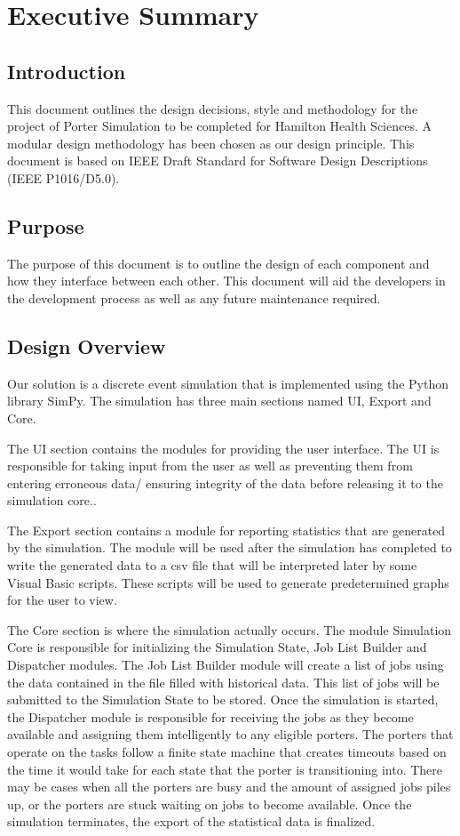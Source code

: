 \documentclass[paper=letter, fontsize=10pt]{scrartcl}
\numberwithin{equation}{section}		%
\numberwithin{figure}{section}			%
\numberwithin{table}{section}				%
\begin{document}
\section{Executive Summary}
\subsection{Introduction}
This document outlines the design decisions, style and methodology for the project of Porter Simulation to be completed for Hamilton Health Sciences.  A modular design methodology has been chosen as our design principle.  This document is based on IEEE Draft Standard for Software Design Descriptions (IEEE P1016/D5.0).
\subsection{Purpose}
The purpose of this document is to outline the design of each component and how they interface between each other. This document will aid the developers in the development process as well as any future maintenance required.
\subsection{Design Overview}
Our solution is a discrete event simulation that is implemented using the Python library SimPy. The simulation has three main sections named UI, Export and Core. 

The UI section contains the modules for providing the user interface. The UI is responsible for taking input from the user as well as preventing them from entering erroneous data/ ensuring integrity of the data before releasing it to the simulation core..

The Export section contains a module for reporting statistics that are generated by the simulation. The module will be used after the simulation has completed to write the generated data to a csv file that will be interpreted later by some Visual Basic scripts. These scripts will be used to generate predetermined graphs for the user to view.

The Core section is where the simulation actually occurs. The module Simulation Core is responsible for initializing the Simulation State, Job List Builder and Dispatcher modules. The Job List Builder module will create a list of jobs using the data contained in the file filled with historical data. This list of jobs will be submitted to the Simulation State to be stored. Once the simulation is started, the Dispatcher module is responsible for receiving the jobs as they become available and assigning them intelligently to any eligible porters. The porters that operate on the tasks follow a finite state machine that creates timeouts based on the time it would take for each state that the porter is transitioning into. There may be cases when all the porters are busy and the amount of assigned jobs piles up, or the porters are stuck waiting on jobs to become available. Once the simulation terminates, the export of the statistical data is finalized.
\end{document}
